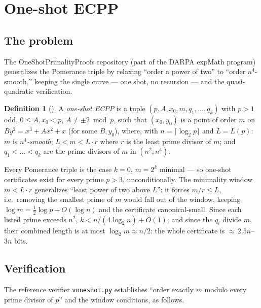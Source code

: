 \documentclass[11pt]{amsart}
\theoremstyle{plain}
\theoremstyle{definition}
\newtheorem{definition}[theorem]{Definition}
\theoremstyle{remark}
\begin{document}
\section{One-shot ECPP}\label{sec:oneshot}

\subsection{The problem}

The OneShotPrimalityProofs repository \cite{OneShot} (part of the DARPA expMath program) generalizes the
Pomerance triple by relaxing ``order a power of two'' to ``order $n^4$-smooth,'' keeping the single
curve --- one shot, no recursion --- and the quasi-quadratic verification.

\begin{definition}[{\cite{OneShot}}]\label{def:oneshot}
A \emph{one-shot ECPP} is a tuple $(p, A, x_0, m, q_1, \dots, q_k)$ with $p > 1$ odd,
$0 \le A, x_0 < p$, $A \ne \pm 2 \bmod p$, such that $(x_0, y_0)$ is a point of order $m$ on
$By^2 = x^3+Ax^2+x$ (for some $B, y_0$), where, with $n = \lceil\log_2 p\rceil$ and $L = L(p)$:
$m$ is \emph{$n^4$-smooth}; $L < m < L\cdot r$ where $r$ is the least prime divisor of $m$; and
$q_1 < \dots < q_k$ are the prime divisors of $m$ in $(n^2, n^4)$.
\end{definition}

Every Pomerance triple is the case $k = 0$, $m = 2^k$ minimal --- so one-shot certificates exist for
every prime $p > 3$, unconditionally.  The minimality window $m < L\cdot r$ generalizes ``least power of
two above $L$'': it forces $m/r \le L$, i.e.\ removing the smallest prime of $m$ would fall out of the
window, keeping $\log m = \frac12\log p + O(\log n)$ and the certificate canonical-small.  Since each
listed prime exceeds $n^2$, $k < n/(4\log_2 n) + O(1)$; and since the $q_i$ divide $m$, their combined
length is at most $\log_2 m \approx n/2$: the whole certificate is ${\approx}\,2.5n$--$3n$ bits.

\subsection{Verification}\label{sec:oneshotverif}

The reference verifier \texttt{voneshot.py} \cite{OneShot} establishes ``order exactly $m$ modulo every
prime divisor of $p$'' and the window conditions, as follows.
\end{document}
